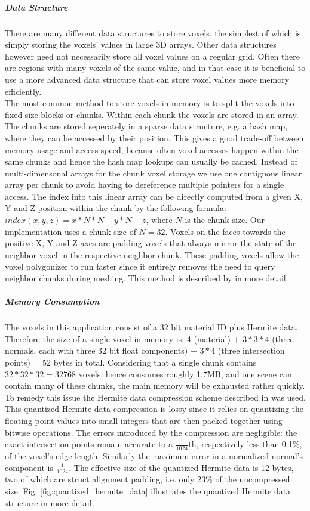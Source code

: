 \subparagraph{Data Structure}

There are many different data structures to store voxels, the simplest of which is simply storing the voxels' values in large 3D arrays.
Other data structures however need not necessarily store all voxel values on a regular grid. Often there are regions with many voxels of the same value, and
in that case it is beneficial to use a more advanced data structure that can store voxel values more memory efficiently.\\
The most common method to store voxels in memory is to split the voxels into fixed size blocks or chunks. Within each chunk the voxels are stored in an array. The chunks are stored seperately in a sparse data structure, e.g. a hash map,
where they can be accessed by their position. This gives a good trade-off between memory usage and access speed, because often voxel accesses happen within the same chunks and hence the hash map lookups can usually be cached. Instead of multi-dimensonal arrays for the chunk voxel storage we use one contiguous linear array per chunk to avoid having to dereference multiple pointers for a single access. The index into this linear array can be directly computed from a given X, Y and Z position within the chunk by the following formula: $index(x, y, z) = x * N * N + y * N + z$, where $N$ is the chunk size.
Our implementation uses a chunk size of $N=32$. Voxels on the faces towards the positive X, Y and Z axes are padding voxels that always mirror the state of the neighbor voxel in the respective neighbor chunk.
These padding voxels allow the voxel polygonizer to run faster since it entirely removes the need to query neighbor chunks during meshing. This method is described by \cite{voxel_acceleration} in more detail.

\subparagraph{Memory Consumption}

The voxels in this application consist of a 32 bit material ID plus Hermite data. Therefore the size of a single voxel in memory is: 4 (material) + $3*3*4$ (three normals, each with three 32 bit float components) + $3*4$ (three intersection points) = 52 bytes in total. Considering that a single chunk contains $32 * 32 * 32 = 32768$ voxels, hence consumes roughly 1.7MB, and one scene can contain many of these chunks,
the main memory will be exhausted rather quickly.
To remedy this issue the Hermite data compression scheme described in \cite{quantized_hermite_data} was used.
This quantized Hermite data compression is lossy since it relies on quantizing the floating point values into small integers that are then packed together using bitwise operations. The errors introduced by the compression are
negligible: the exact intersection points remain accurate to a $\frac{1}{1024}$th, respectively less than 0.1\%, of the voxel's edge length. Similarly the maximum error in a normalized normal's component is $\frac{1}{1024}$.
The effective size of the quantized Hermite data is 12 bytes, two of which are struct alignment padding, i.e. only 23\% of the uncompressed size. Fig. \ref{fig:quantized_hermite_data} illustrates the quantized Hermite data
structure in more detail.

